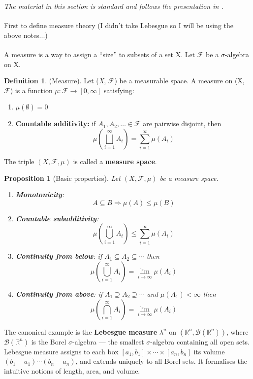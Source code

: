 \documentclass[11pt, a4paper]{article}
\theoremstyle{plain}
\newtheorem{proposition}[theorem]{Proposition}
\theoremstyle{definition}
\newtheorem{definition}[theorem]{Definition}
\theoremstyle{remark}
\newcommand{\R}{\mathbb{R}}
\begin{document}
\noindent\textit{The material in this section is standard and follows 
the presentation in \cite{menegaki2026}.}\\\\
First to define measure theory (I didn't take Lebesgue so I will be using the above notes...)\\\\
A measure is a way to assign a ``size'' to subsets of a set X. Let $\mathcal{F}$ be a $\sigma$-algebra on X.\\
\begin{definition} (Measure). Let (\textit{X}, $\mathcal{F}$) be a measurable space. A measure on (X, $\mathcal{F}$) is a function $\mu : \mathcal{F} \rightarrow [0, \infty]$ satisfying:
\begin{enumerate}
\item $\mu(\emptyset) = 0$
\item \textbf{Countable additivity:} if $A_1, A_2, \ldots \in \mathcal{F}$ are 
    pairwise disjoint, then
    \[
      \mu\!\left(\bigsqcup_{i=1}^{\infty} A_i\right) = \sum_{i=1}^{\infty} \mu(A_i)
    \]
\end{enumerate}
The triple $(X, \mathcal{F}, \mu)$ is called a \textbf{measure space}.
\end{definition}
\vspace{2pt}\begin{proposition}[Basic properties]
  Let $(X, \mathcal{F}, \mu)$ be a measure space.
  \begin{enumerate}
    \item \textbf{Monotonicity}: \[A \subseteq B \Rightarrow \mu(A) \leq \mu(B)\]
    \item \textbf{Countable subadditivity}: 
    \[\mu\!\left(\bigcup_{i=1}^{\infty} A_i\right) \leq \sum_{i=1}^{\infty} \mu(A_i)\]
    \item \textbf{Continuity from below}: if $A_1 \subseteq A_2 \subseteq \cdots$ then
    \[
      \mu\!\left(\bigcup_{i=1}^{\infty} A_i\right) = \lim_{i \to \infty} \mu(A_i)
    \]
    \item \textbf{Continuity from above}: if $A_1 \supseteq A_2 \supseteq \cdots$ 
    and $\mu(A_1) < \infty$ then
    \[
      \mu\!\left(\bigcap_{i=1}^{\infty} A_i\right) = \lim_{i \to \infty} \mu(A_i)
    \]
  \end{enumerate}
\end{proposition}

The canonical example is the \textbf{Lebesgue measure} $\lambda^n$ on 
$(\R^n, \mathcal{B}(\R^n))$, where $\mathcal{B}(\R^n)$ is the Borel $\sigma$-algebra 
--- the smallest $\sigma$-algebra containing all open sets. Lebesgue measure assigns 
to each box $[a_1, b_1] \times \cdots \times [a_n, b_n]$ its volume 
$(b_1 - a_1) \cdots (b_n - a_n)$, and extends uniquely to all Borel sets. It 
formalises the intuitive notions of length, area, and volume.
\end{document}
